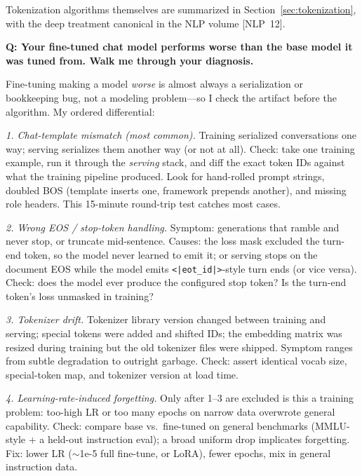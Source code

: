 Tokenization algorithms themselves are summarized in Section~\ref{sec:tokenization}, with the deep treatment canonical in the NLP volume [NLP~12].

\begin{interviewq}
\textbf{Q: Your fine-tuned chat model performs worse than the base model it was tuned from. Walk me through your diagnosis.}

 \quad {} \quad \badgefreq{\freqhigh}

\stronganswer Fine-tuning making a model \emph{worse} is almost always a serialization or bookkeeping bug, not a modeling problem---so I check the artifact before the algorithm. My ordered differential:

\textit{1. Chat-template mismatch (most common).} Training serialized conversations one way; serving serializes them another way (or not at all). Check: take one training example, run it through the \emph{serving} stack, and diff the exact token IDs against what the training pipeline produced. Look for hand-rolled prompt strings, doubled BOS (template inserts one, framework prepends another), and missing role headers. This 15-minute round-trip test catches most cases.

\textit{2. Wrong EOS / stop-token handling.} Symptom: generations that ramble and never stop, or truncate mid-sentence. Causes: the loss mask excluded the turn-end token, so the model never learned to emit it; or serving stops on the document EOS while the model emits \texttt{<|eot\_id|>}-style turn ends (or vice versa). Check: does the model ever produce the configured stop token? Is the turn-end token's loss unmasked in training?

\textit{3. Tokenizer drift.} Tokenizer library version changed between training and serving; special tokens were added and shifted IDs; the embedding matrix was resized during training but the old tokenizer files were shipped. Symptom ranges from subtle degradation to outright garbage. Check: assert identical vocab size, special-token map, and tokenizer version at load time.

\textit{4. Learning-rate-induced forgetting.} Only after 1--3 are excluded is this a training problem: too-high LR or too many epochs on narrow data overwrote general capability. Check: compare base vs.\ fine-tuned on general benchmarks (MMLU-style + a held-out instruction eval); a broad uniform drop implicates forgetting. Fix: lower LR ($\sim$1e-5 full fine-tune, or LoRA), fewer epochs, mix in general instruction data.


\end{interviewq}

